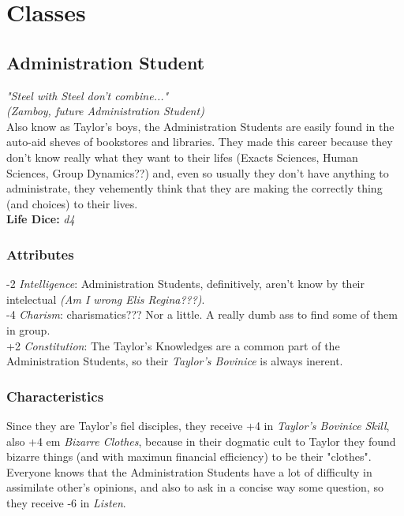\documentclass[ letterpaper,12pt]{article}
\begin{document}
\section{Classes}

\subsection{Administration Student}
{\it "Steel with Steel don't combine..."\\(Zamboy, future Administration Student)}\\

Also know as Taylor's boys, the Administration Students are easily found in the auto-aid sheves of bookstores and libraries. They made this career because they don't know really what they want to their lifes (Exacts Sciences, Human Sciences, Group Dynamics??) and, even so usually they don't have anything to administrate, they vehemently think that they are making the correctly thing (and choices) to their lives.\\ 

{\bf Life Dice:} {\it d4}

\subsubsection{Attributes}
-2 {\it Intelligence}: Administration Students, definitively,  aren't know by their intelectual {\it (Am I wrong Elis Regina???)}.\\
-4 {\it Charism}: charismatics??? Nor a little. A really dumb ass to find some of them in group.\\
+2 {\it Constitution}: The Taylor's Knowledges are a common part of the Administration Students, so their {\it Taylor's Bovinice} is always inerent.


\subsubsection{Characteristics}
Since they are Taylor's fiel disciples, they receive +4 in {\it Taylor's Bovinice Skill}, also +4 em {\it Bizarre Clothes}, because in their dogmatic cult to Taylor they found bizarre things (and with maximun financial efficiency) to be their "clothes". \\

Everyone knows that the Administration Students have a lot of difficulty in assimilate other's opinions, and also to ask in a concise way some question, so they receive -6 in {\it Listen}.
\end{document}

